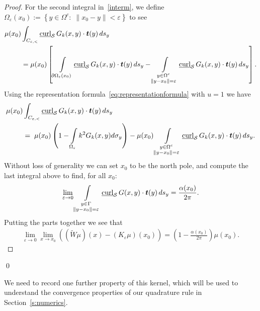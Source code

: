 \begin{proof}
For the second integral in~\eqref{interm}, we define
$\Omega_{\varepsilon}(x_{0}):=\left\{ y\in\Omega^{c}:\; \|x_0-y\|<
\varepsilon \right\}$ to see
\begin{align*}
  \mu(x_0)&\int_{C_{\e,<}} \underline{\mbox{curl}}_{\S}\,
    G_k(x,y)\cdot\vec{t}(y)\,ds_{y} \\
  &= \mu(x_0) \left[ \int\limits_{\partial \Omega_{\varepsilon}(x_0)} 
  \underline{\mbox{curl}}_{\S}\,G_k(x,y)\cdot\vec{t}(y)\,ds_{y} - 
  \int\limits_{\substack{y \in \Omega^{c} \\ \|y - x_{0}\| =
  \varepsilon}}
\underline{\mbox{curl}}_{\S}\,G_k(x,y)\cdot\vec{t}(y)\,ds_{y} \right].
\end{align*}
Using the representation formula~\eqref{eq:representationformula} with
$u=1$ we have
\begin{align*}
  \mu(x_0)&\int_{C_{\e,<}} \underline{\mbox{curl}}_{\S}\,
    G_k(x,y)\cdot\vec{t}(y)\,ds_{y} \\
    &=\;\mu(x_0) \left(1 - \int\limits_{\Omega_{\varepsilon}} 
    k^2 G_k(x,y) d\sigma_{y}\right) 
   - \mu(x_0) \int\limits_{\substack{y \in \Omega^{c} \\ \|y - x_{0}\| =
  \varepsilon}}
\underline{\mbox{curl}}_{\S}\,G_k(x,y)\cdot\vec{t}(y)\,ds_{y}.
\end{align*}
Without loss of generality we can set $x_0$ to be the north pole, and
compute the last integral above  to find, for all $x_{0}$: 
\begin{align*}
  \lim_{\varepsilon\rightarrow 0}
  \int\limits_{\substack{y \in \Gamma \\ \|y - x_{0}\| = \varepsilon}}
  \underline{\mbox{curl}}_{\S}\,G(x,y)\cdot\vec{t}(y)\,ds_{y}
  =\frac{\alpha(x_0)}{2\pi}.
\end{align*}
Putting the parts together we see that
\begin{align*}
  \lim_{\varepsilon\rightarrow 0} \lim_{x\rightarrow x_0}
  \left((\widetilde{W}\mu)(x)-(K_{\varepsilon}\mu)(x_0)\right)
  =\left(1-\frac{\alpha(x_0)}{2\pi}\right)\mu(x_0).
\end{align*}
\end{proof}
\qed


We need to record one further property of this kernel, which will be
used to understand the convergence properties of our quadrature rule in
Section~\ref{s:numerics}.

